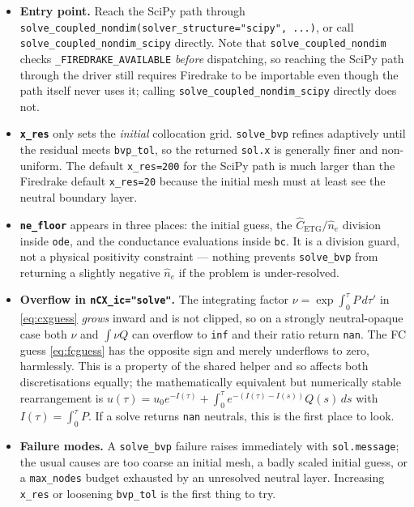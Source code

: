 \documentclass[11pt]{article}
\newcommand{\hn}{\hat{n}}
\newcommand{\code}[1]{\texttt{#1}}
\begin{document}
\begin{itemize}
  \item \textbf{Entry point.}  Reach the SciPy path through
        \code{solve\_coupled\_nondim(solver\_structure="scipy", ...)}, or
        call \code{solve\_coupled\_nondim\_scipy} directly.  Note that
        \code{solve\_coupled\_nondim} checks
        \code{\_FIREDRAKE\_AVAILABLE} \emph{before} dispatching, so
        reaching the SciPy path through the driver still requires
        Firedrake to be importable even though the path itself never uses
        it; calling \code{solve\_coupled\_nondim\_scipy} directly does
        not.
  \item \textbf{\code{x\_res}} only sets the \emph{initial} collocation
        grid.  \code{solve\_bvp} refines adaptively until the residual
        meets \code{bvp\_tol}, so the returned \code{sol.x} is generally
        finer and non-uniform.  The default \code{x\_res=200} for the
        SciPy path is much larger than the Firedrake default
        \code{x\_res=20} because the initial mesh must at least see the
        neutral boundary layer.
  \item \textbf{\code{ne\_floor}} appears in three places: the initial
        guess, the $\hat{C}_{\mathrm{ETG}}/\hn_e$ division inside
        \code{ode}, and the conductance evaluations inside \code{bc}.  It
        is a division guard, not a physical positivity constraint ---
        nothing prevents \code{solve\_bvp} from returning a slightly
        negative $\hn_e$ if the problem is under-resolved.
  \item \textbf{Overflow in \code{nCX\_ic="solve"}.}  The integrating
        factor $\nu = \exp\!\int_0^\tau P\,d\tau'$ in \eqref{eq:cxguess}
        \emph{grows} inward and is not clipped, so on a strongly
        neutral-opaque case both $\nu$ and $\int \nu Q$ can overflow to
        \code{inf} and their ratio return \code{nan}.  The FC guess
        \eqref{eq:fcguess} has the opposite sign and merely underflows
        to zero, harmlessly.  This is a property of the shared helper
        and so affects both discretisations equally; the mathematically
        equivalent but numerically stable rearrangement is
        $u(\tau) = u_0 e^{-I(\tau)}
         + \int_0^\tau e^{-(I(\tau) - I(s))} Q(s)\,ds$
        with $I(\tau) = \int_0^\tau P$.  If a solve returns \code{nan}
        neutrals, this is the first place to look.
  \item \textbf{Failure modes.}  A \code{solve\_bvp} failure raises
        immediately with \code{sol.message}; the usual causes are too
        coarse an initial mesh, a badly scaled initial guess, or a
        \code{max\_nodes} budget exhausted by an unresolved neutral
        layer.  Increasing \code{x\_res} or loosening \code{bvp\_tol} is
        the first thing to try.
\end{itemize}
\end{document}
